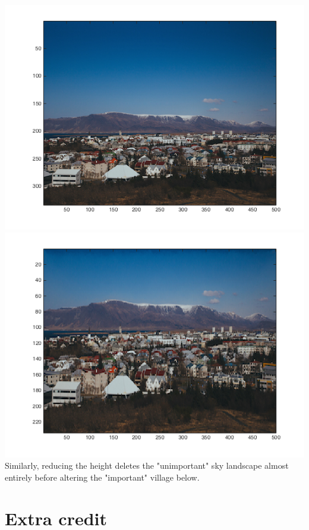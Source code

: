 \documentclass[11pt]{amsart}
\begin{document}
\begin{center}
\includegraphics[scale=0.40]{originalVillage.png}
\includegraphics[scale=0.40]{outputReduceHeightVillage.png}
Similarly, reducing the height deletes the "unimportant" sky landscape almost entirely before altering the "important" village below. \\

\end{center}




\begingroup
\Huge\section{Extra credit}
\endgroup
\end{document}
